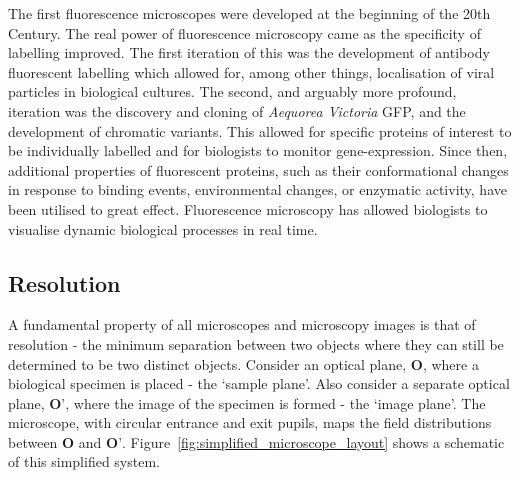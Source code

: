 The first fluorescence microscopes were developed at the beginning of the 20th Century\cite{renz2013fluorescence,yuste2005fluorescence}. The real power of 
fluorescence microscopy came as the specificity of labelling improved. The 
first iteration of this was the development of antibody fluorescent labelling 
which allowed for, among other things, localisation of viral particles in 
biological 
cultures\cite{coons1942demonstration,coons1951fluorescent,weller1954fluorescent}.
The second, and arguably more profound, iteration was the discovery and 
cloning of \textit{Aequorea Victoria} GFP, and the development of chromatic
variants\cite{prasher1992primary,heim1996engineering}. This allowed for 
specific proteins of interest to be individually labelled and for biologists 
to monitor gene-expression\cite{chalfie1994green}. Since then, additional 
properties of fluorescent proteins, such as their conformational changes 
in response to binding events, environmental changes, or enzymatic activity, 
have been utilised to great effect\cite{toseland2013fluorescent}. 
Fluorescence microscopy has allowed biologists to visualise dynamic biological
processes in real time.

\subsection{Resolution}
\label{subsec:resolution}

A fundamental property of all microscopes and microscopy images is that of 
resolution - the minimum separation between two objects where they can still
be determined to be two distinct objects. Consider an optical plane, 
$\textbf{O}$, where a biological specimen is placed - the `sample plane'. Also
consider a separate optical plane, $\textbf{O'}$, where the image of the
specimen is formed - the `image plane'. The microscope, with circular entrance
and exit pupils, maps the field distributions between $\textbf{O}$ and 
$\textbf{O'}$. Figure~\ref{fig:simplified_microscope_layout} shows a schematic
of this simplified system.

